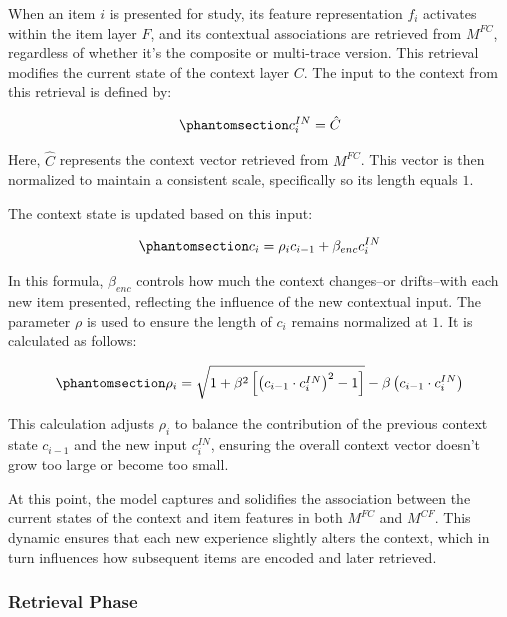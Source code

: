 \documentclass[
  letterpaper,
  11pt,
  english,
  singlespacing,
  headsepline]{MastersDoctoralThesis}
\begin{document}
When an item \(i\) is presented for study, its feature representation
\(f_i\) activates within the item layer \(F\), and its contextual
associations are retrieved from \(M^{FC}\), regardless of whether it's
the composite or multi-trace version. This retrieval modifies the
current state of the context layer \(C\). The input to the context from
this retrieval is defined by:

\begin{equation}\phantomsection\label{eq-12}{
c^{IN}_{i} = \hat{C}
}\end{equation}

Here, \(\hat{C}\) represents the context vector retrieved from
\(M^{FC}\). This vector is then normalized to maintain a consistent
scale, specifically so its length equals \(1\).

The context state is updated based on this input:

\begin{equation}\phantomsection\label{eq-13}{
c_i = \rho_i c_{i-1} + \beta_{enc} c_{i}^{IN}
}\end{equation}

In this formula, \(\beta_{enc}\) controls how much the context
changes--or drifts--with each new item presented, reflecting the
influence of the new contextual input. The parameter \(\rho\) is used to
ensure the length of \(c_i\) remains normalized at \(1\). It is
calculated as follows:

\begin{equation}\phantomsection\label{eq-14}{
\rho_i = \sqrt{1 + \beta^2\left[\left(c_{i-1} \cdot c^{IN}_i\right)^2 - 1\right]} - \beta\left(c_{i-1} \cdot c^{IN}_i\right)
}\end{equation}

This calculation adjusts \(\rho_i\) to balance the contribution of the
previous context state \(c_{i-1}\) and the new input \(c^{IN}_i\),
ensuring the overall context vector doesn't grow too large or become too
small.

At this point, the model captures and solidifies the association between
the current states of the context and item features in both \(M^{FC}\)
and \(M^{CF}\). This dynamic ensures that each new experience slightly
alters the context, which in turn influences how subsequent items are
encoded and later retrieved.

\subsubsection{Retrieval Phase}\label{retrieval-phase}
\end{document}
